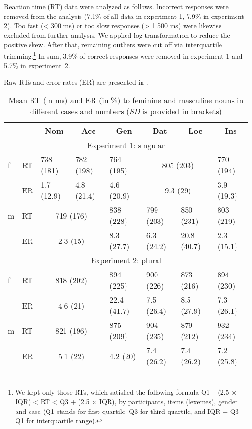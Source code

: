\documentclass[output=paper, modfonts,newtxmath,hidelinks]{langscibook}
\begin{document}
Reaction time (RT) data were analyzed as follows. Incorrect responses were removed from the analysis (7.1\% of all data in experiment 1, 7.9\% in experiment 2). Too fast (< 300 ms) or too slow responses (> 1 500 ms) were likewise excluded from further analysis. We applied log-transformation to reduce the positive skew. After that, remaining outliers were cut off via interquartile trimming.\footnote{We kept only those RTs, which satisfied the following formula Q1 – (2.5 × IQR) < RT < Q3 + (2.5 × IQR), by participants, items (lexemes), gender and case (Q1 stands for first quartile, Q3 for third quartile, and IQR = Q3 – Q1 for interquartile range).} In sum, 3.9\% of correct responses were removed in experiment 1 and 5.7\% in experiment~2.

Raw RTs and error rates (ER) are presented in .
\begin{table}
    \caption{Mean RT (in ms) and ER (in \%) to feminine and masculine nouns in different cases and numbers (\textit{SD} is provided in brackets)}
    \label{tab:descrSg}
    \begin{tabular}{*{8}l}
        \lsptoprule
        ~   &   ~   &    \multicolumn{1}{c}{Nom}    &   \multicolumn{1}{c}{Acc} &   \multicolumn{1}{c}{Gen} &  \multicolumn{1}{c}{Dat} &   \multicolumn{1}{c}{Loc}  &   \multicolumn{1}{c}{Ins}\\
        \midrule
        \multicolumn{8}{c}{Experiment 1: singular}\\
        \midrule
        f   &   RT  &   738 (181)   &   782 (198)		&  764 (195)    & \multicolumn{2}{c}{ 805 (203)} &   770 (194)\\
        ~   &   ER  &   1.7 (12.9)  &    4.8 (21.4)   &  4.6 (20.9)   &   \multicolumn{2}{c}{9.3 (29)}  &   3.9 (19.3)\\
        m   &   RT  &   \multicolumn{2}{c}{719 (176)}    &   838 (228)   &   799 (203)    &   850 (231) &   803 (219)  \\
        ~   &   ER  &   \multicolumn{2}{c}{2.3 (15)}    &   8.3 (27.7)  &   6.3 (24.2) &  20.8 (40.7) &   2.3 (15.1) \\
        \midrule
        \multicolumn{8}{c}{Experiment 2: plural}\\
        \midrule
        f   &   RT  &   \multicolumn{2}{c}{818	(202)}   &	894 (225)   &   900 (226)   &   873 (216)
&	894 (230)   \\
        ~   &   ER  &   \multicolumn{2}{c}{4.6  (21)}    &	22.4 (41.7) &	7.5 (26.4)  &	8.5 (27.9)  &	7.3	(26.1)\\ 
        m   &   RT  &   \multicolumn{2}{c}{821 (196)}     &   875	(209)   &   904 (235)   &   879	(212)   &   932 (234) \\
        ~   &   ER  &  \multicolumn{2}{c}{5.1 (22)}  &   4.2	(20)    &	7.4 (26.2) &   7.4 (26.2)   &   7.2 (25.8)  \\
        \lspbottomrule
    \end{tabular}
\end{table}
\end{document}
